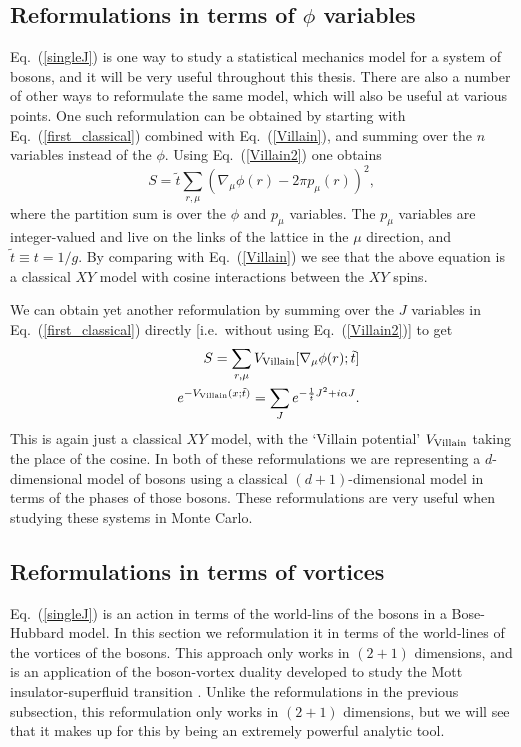 \subsection{Reformulations in terms of $\phi$ variables}
Eq.~(\ref{singleJ}) is one way to study a statistical mechanics model for a system of bosons, and it will be very useful throughout this thesis. There are also a number of other ways to reformulate the same model, which will also be useful at various points. One such reformulation can be obtained by starting with Eq.~(\ref{first_classical}) combined with Eq.~(\ref{Villain}), and summing over the $n$ variables instead of the $\phi$. Using Eq.~(\ref{Villain2}) one obtains
\begin{equation}
S=\tilde t \sum_{r,\mu} (\nabla_\mu \phi(r)-2\pi p_\mu(r))^2,
\label{singleRods}
\end{equation}
where the partition sum is over the $\phi$ and $p_\mu$ variables. The $p_\mu$ variables are integer-valued and live on the links of the lattice in the $\mu$ direction, and $\tilde t\equiv t=1/g$. By comparing with Eq.~(\ref{Villain}) we see that the above equation is a classical $XY$ model with cosine interactions between the $XY$ spins.

We can obtain yet another reformulation by summing over the $J$ variables in Eq.~(\ref{first_classical}) directly [i.e.~without using Eq.~(\ref{Villain2})] to get
\begin{eqnarray}
&&S=\sum_{r,\mu} V_{\rm Villain} [\nabla_\mu \phi(r);\tilde t]\nonumber\\
&&e^{-V_{\rm Villain}(x;\tilde t)}=\sum_{J} e^{-\frac{1}{\tilde t} J^2+i\alpha J}.
\label{singleVillain}
\end{eqnarray}
This is again just a classical $XY$ model, with the `Villain potential' $V_{\rm Villain}$ taking the place of the cosine. In both of these reformulations we are representing a $d$-dimensional model of bosons using a classical $(d+1)$-dimensional model in terms of the phases of those bosons. These reformulations are very useful when studying these systems in Monte Carlo. 

\subsection{Reformulations in terms of vortices}
\label{subsec::JtoQ}
Eq.~(\ref{singleJ}) is an action in terms of the world-lins of the bosons in a Bose-Hubbard model. In this section we reformulation it in terms of the world-lines of the vortices of the bosons. This approach only works in $(2+1)$ dimensions, and is an application of the boson-vortex duality developed to study the Mott insulator-superfluid transition\cite{PolyakovBook, Peskin1978, Dasgupta1981, FisherLee1989, LeeFisher1989, artphoton,short_range3} . Unlike the reformulations in the previous subsection, this reformulation only works in $(2+1)$ dimensions, but we will see that it makes up for this by being an extremely powerful analytic tool. 

